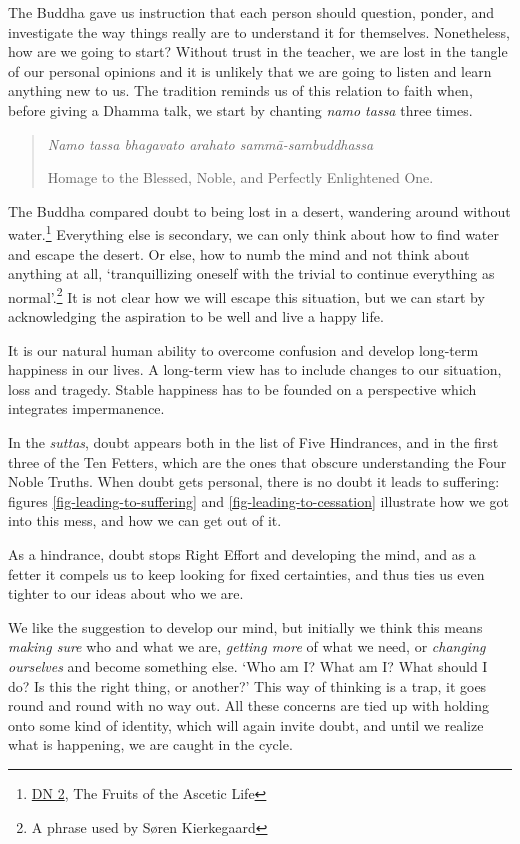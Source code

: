 The Buddha gave us instruction that each person should question, ponder,
and investigate the way things really are to understand it for
themselves. Nonetheless, how are we going to start? Without trust in the
teacher, we are lost in the tangle of our personal opinions and it is
unlikely that we are going to listen and learn anything new to us. The
tradition reminds us of this relation to faith when, before giving a
Dhamma talk, we start by chanting \emph{namo tassa} three times.

\begin{quote}
\emph{Namo tassa bhagavato arahato sammā-sambuddhassa}

Homage to the Blessed, Noble, and Perfectly Enlightened One.
\end{quote}


The Buddha compared doubt to being lost in a desert, wandering around
without water.\footnote{\href{https://suttacentral.net/dn2}{DN 2}, The
  Fruits of the Ascetic Life} Everything else is secondary, we can only
think about how to find water and escape the desert. Or else, how to
numb the mind and not think about anything at all, `tranquillizing
oneself with the trivial to continue everything as normal'.\footnote{A
  phrase used by Søren Kierkegaard} It is not clear how we will escape
this situation, but we can start by acknowledging the aspiration to be
well and live a happy life.

It is our natural human ability to overcome confusion and develop
long-term happiness in our lives. A long-term view has to include
changes to our situation, loss and tragedy. Stable happiness has to be
founded on a perspective which integrates impermanence.

In the \emph{suttas}, doubt appears both in the list of Five Hindrances,
and in the first three of the Ten Fetters, which are the ones that
obscure understanding the Four Noble Truths. When doubt gets personal,
there is no doubt it leads to suffering: figures
\ref{fig-leading-to-suffering} and \ref{fig-leading-to-cessation}
illustrate how we got into this mess, and how we can get out of it.

As a hindrance, doubt stops Right Effort and developing the mind, and as
a fetter it compels us to keep looking for fixed certainties, and thus
ties us even tighter to our ideas about who we are.

We like the suggestion to develop our mind, but initially we think this
means \emph{making sure} who and what we are, \emph{getting more} of
what we need, or \emph{changing ourselves} and become something else.
`Who am I? What am I? What should I do? Is this the right thing, or
another?' This way of thinking is a trap, it goes round and round with
no way out. All these concerns are tied up with holding onto some kind
of identity, which will again invite doubt, and until we realize what is
happening, we are caught in the cycle.

